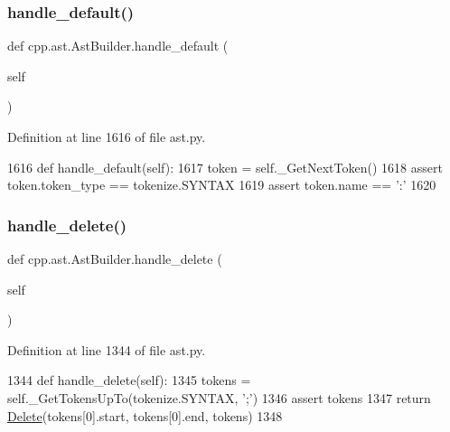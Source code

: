 \subsubsection{\texorpdfstring{handle\+\_\+default()}{handle\_default()}}
{\footnotesize\ttfamily def cpp.\+ast.\+Ast\+Builder.\+handle\+\_\+default (\begin{DoxyParamCaption}\item[{}]{self }\end{DoxyParamCaption})}



Definition at line 1616 of file ast.\+py.


\begin{DoxyCode}
1616     \textcolor{keyword}{def }handle\_default(self):
1617         token = self.\_GetNextToken()
1618         \textcolor{keyword}{assert} token.token\_type == tokenize.SYNTAX
1619         \textcolor{keyword}{assert} token.name == \textcolor{stringliteral}{':'}
1620 
\end{DoxyCode}
\mbox{\label{classcpp_1_1ast_1_1AstBuilder_aa5b7a781afe524bebdf42bdeb4766507}} 
\subsubsection{\texorpdfstring{handle\+\_\+delete()}{handle\_delete()}}
{\footnotesize\ttfamily def cpp.\+ast.\+Ast\+Builder.\+handle\+\_\+delete (\begin{DoxyParamCaption}\item[{}]{self }\end{DoxyParamCaption})}



Definition at line 1344 of file ast.\+py.


\begin{DoxyCode}
1344     \textcolor{keyword}{def }handle\_delete(self):
1345         tokens = self.\_GetTokensUpTo(tokenize.SYNTAX, \textcolor{stringliteral}{';'})
1346         \textcolor{keyword}{assert} tokens
1347         \textcolor{keywordflow}{return} \hyperlink{namespacetesting_1_1internal_a1e7045e09392aece10aea4517458b7ed}{Delete}(tokens[0].start, tokens[0].end, tokens)
1348 
\end{DoxyCode}
\mbox{\label{classcpp_1_1ast_1_1AstBuilder_a540226b483513b423d4ec2c4f10b18f5}} 
